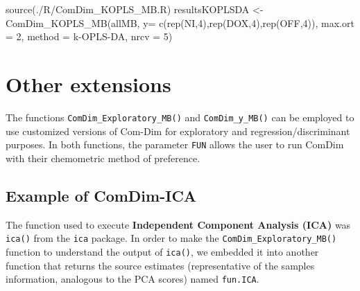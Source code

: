 \documentclass[
]{book}
\newenvironment{Shaded}{\begin{snugshade}}{\end{snugshade}}
\newcommand{\AttributeTok}[1]{\textcolor[rgb]{0.77,0.63,0.00}{#1}}
\newcommand{\DecValTok}[1]{\textcolor[rgb]{0.00,0.00,0.81}{#1}}
\newcommand{\FunctionTok}[1]{\textcolor[rgb]{0.00,0.00,0.00}{#1}}
\newcommand{\NormalTok}[1]{#1}
\newcommand{\OtherTok}[1]{\textcolor[rgb]{0.56,0.35,0.01}{#1}}
\newcommand{\StringTok}[1]{\textcolor[rgb]{0.31,0.60,0.02}{#1}}
\begin{document}
\begin{Shaded}
\begin{Highlighting}[]
\FunctionTok{source}\NormalTok{(}\StringTok{\textquotesingle{}./R/ComDim\_KOPLS\_MB.R\textquotesingle{}}\NormalTok{)}
\NormalTok{resultsKOPLSDA }\OtherTok{\textless{}{-}} \FunctionTok{ComDim\_KOPLS\_MB}\NormalTok{(allMB, }\AttributeTok{y=} \FunctionTok{c}\NormalTok{(}\FunctionTok{rep}\NormalTok{(}\StringTok{\textquotesingle{}NI\textquotesingle{}}\NormalTok{,}\DecValTok{4}\NormalTok{),}\FunctionTok{rep}\NormalTok{(}\StringTok{\textquotesingle{}DOX\textquotesingle{}}\NormalTok{,}\DecValTok{4}\NormalTok{),}\FunctionTok{rep}\NormalTok{(}\StringTok{\textquotesingle{}OFF\textquotesingle{}}\NormalTok{,}\DecValTok{4}\NormalTok{)),}
                                  \AttributeTok{max.ort =} \DecValTok{2}\NormalTok{, }\AttributeTok{method =} \StringTok{\textquotesingle{}k{-}OPLS{-}DA\textquotesingle{}}\NormalTok{, }\AttributeTok{nrcv =} \DecValTok{5}\NormalTok{)}
\end{Highlighting}
\end{Shaded}

\hypertarget{Other}{%
\section{Other extensions}\label{Other}}

The functions \texttt{ComDim\_Exploratory\_MB()} and \texttt{ComDim\_y\_MB()} can be employed to
use customized versions of Com-Dim for exploratory and regression/discriminant
purposes. In both functions, the parameter \texttt{FUN} allows the user to run ComDim
with their chemometric method of preference.

\hypertarget{example-of-comdim-ica}{%
\subsection{Example of ComDim-ICA}\label{example-of-comdim-ica}}

The function used to execute \textbf{Independent Component Analysis (ICA)} was
\texttt{ica()} from the \texttt{ica} package.
In order to make the \texttt{ComDim\_Exploratory\_MB()} function to understand the output
of \texttt{ica()}, we embedded it into another function that returns the source
estimates (representative of the samples information, analogous to the PCA
scores) named \texttt{fun.ICA}.
\end{document}
